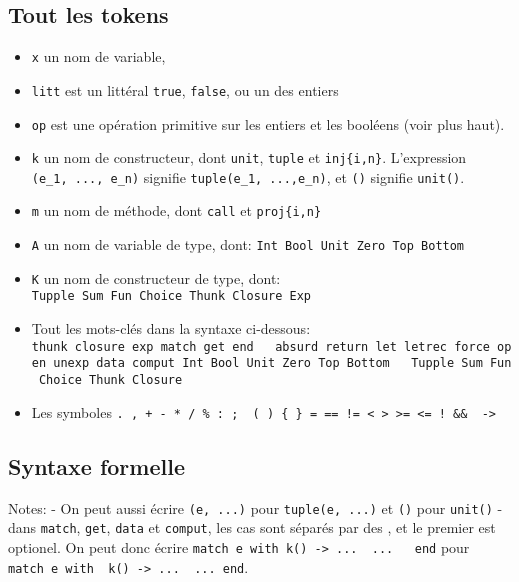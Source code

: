 \documentclass[
]{article}
\providecommand{\tightlist}{%
  \setlength{\itemsep}{0pt}\setlength{\parskip}{0pt}}
\begin{document}
\hypertarget{tout-les-tokens}{%
\subsection{Tout les tokens}\label{tout-les-tokens}}

\begin{itemize}
\tightlist
\item
  \texttt{x} un nom de variable,
\item
  \texttt{litt} est un littéral \texttt{true}, \texttt{false}, ou un des
  entiers
\item
  \texttt{op} est une opération primitive sur les entiers et les
  booléens (voir plus haut).
\item
  \texttt{k} un nom de constructeur, dont \texttt{unit}, \texttt{tuple}
  et \texttt{inj\{i,n\}}. L'expression \texttt{(e\_1,\ ...,\ e\_n)}
  signifie \texttt{tuple(e\_1,\ ...,e\_n)}, et \texttt{()} signifie
  \texttt{unit()}.
\item
  \texttt{m} un nom de méthode, dont \texttt{call} et
  \texttt{proj\{i,n\}}
\item
  \texttt{A} un nom de variable de type, dont:
  \texttt{Int\ Bool\ Unit\ Zero\ Top\ Bottom}
\item
  \texttt{K} un nom de constructeur de type, dont:
  \texttt{Tupple\ Sum\ Fun\ Choice\ Thunk\ Closure\ Exp}
\item
  Tout les mots-clés dans la syntaxe ci-dessous:
  \texttt{thunk\ closure\ exp\ match\ get\ end\ \ \ absurd\ return\ let\ letrec\ force\ open\ unexp\ data\ comput\ Int\ Bool\ Unit\ Zero\ Top\ Bottom\ \ \ Tupple\ Sum\ Fun\ Choice\ Thunk\ Closure}
\item
  Les symboles
  \texttt{.\ ,\ +\ -\ *\ /\ \%\ :\ ;\ \textbar{}\ (\ )\ \{\ \}\ =\ ==\ !=\ \textless{}\ \textgreater{}\ \textgreater{}=\ \textless{}=\ !\ \&\&\ \textbar{}\textbar{}\ -\textgreater{}}
\end{itemize}

\hypertarget{syntaxe-formelle}{%
\subsection{Syntaxe formelle}\label{syntaxe-formelle}}

Notes: - On peut aussi écrire \texttt{(e,\ ...)} pour
\texttt{tuple(e,\ ...)} et \texttt{()} pour \texttt{unit()} - dans
\texttt{match}, \texttt{get}, \texttt{data} et \texttt{comput}, les cas
sont séparés par des \texttt{\textbar{}}, et le premier est optionel. On
peut donc écrire
\texttt{match\ e\ with\ k()\ -\textgreater{}\ ...\ \textbar{}\ ...\ \ \ end}
pour
\texttt{match\ e\ with\ \textbar{}\ k()\ -\textgreater{}\ ...\ \textbar{}\ ...\ end}.
\end{document}
